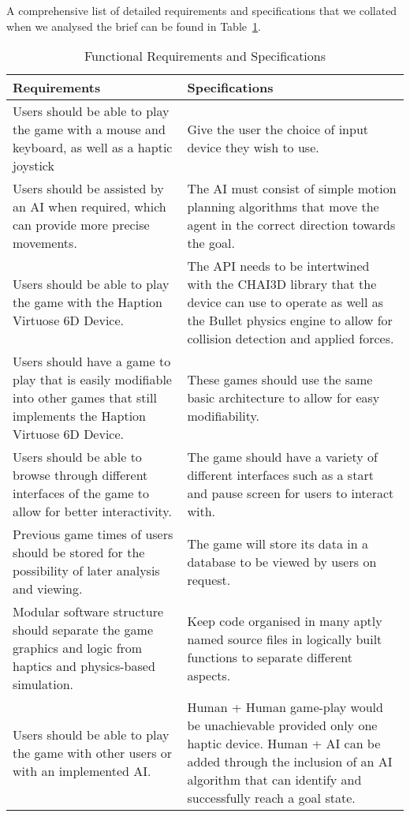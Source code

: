 \documentclass[a4paper]{article}
\begin{document}
A comprehensive list of detailed requirements and specifications that we collated when we analysed the brief can be found in Table~\ref{tab:my_label1}.

\begin{table}[H]
    \centering
    \begin{tabular}{|p{6cm}|p{6cm}|}
        \hline
        Requirements & Specifications  \\
        \hline
        Users should be able to play the game with a mouse and keyboard, as well as a haptic joystick
        &
        Give the user the choice of input device they wish to use.  \\
        \hline
        Users should be assisted by an AI when required, which can provide more precise movements. 
        &
        The AI must consist of simple motion planning algorithms that move the agent in the correct direction towards the goal. \\
        \hline
        Users should be able to play the game with the Haption Virtuose 6D Device. 
        &
        The API needs to be intertwined with the CHAI3D library that the device can use to operate as well as the Bullet physics engine to allow for collision detection and applied forces. \\
        \hline
        Users should have a game to play that is easily modifiable into other games that still implements the  Haption Virtuose 6D Device.
        &
        These games should use the same basic architecture to allow for easy modifiability. \\
        \hline
        Users should be able to browse through different interfaces of the game to allow for better interactivity. 
        &
        The game should have a variety of different interfaces such as a start and pause screen for users to interact with. \\
        \hline
        Previous game times of users should be stored for the possibility of later analysis and viewing.
        &
        The game will store its data in a database to be viewed by users on request. \\
        \hline
        Modular software structure should separate the game graphics and logic from haptics and physics-based simulation.
        &
        Keep code organised in many aptly named source files in logically built functions to separate different aspects. \\
        \hline
        Users should be able to play the game with other users or with an implemented AI.
        &
        Human + Human game-play would be unachievable provided only one haptic device. Human + AI can be added through the inclusion of an AI algorithm that can identify and successfully reach a goal state. \\
        \hline
    \end{tabular}
    \caption{Functional Requirements and Specifications}
    \label{tab:my_label1}
\end{table}
\end{document}
